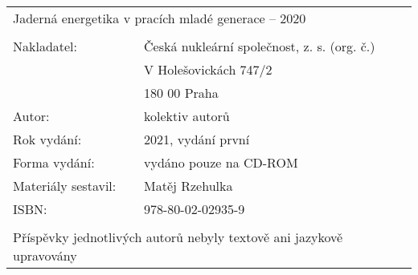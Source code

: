 \documentclass[11pt,oneside]{article}
\begin{document}
\vspace*{13cm}

\begin{table}[h]%
    \begin{tabular}{p{} p{}}%
        \multicolumn{2}{l}{Jaderná energetika v pracích mladé generace – 2020} \\
                            &                           \\
        Nakladatel:         & Česká nukleární společnost, z. s. (org. č.) \\
                            & V Holešovickách 747/2     \\
                            & 180 00 Praha              \\
        Autor:              & kolektiv autorů           \\
        Rok vydání: 	    & 2021, vydání první        \\
        Forma vydání:       & vydáno pouze na CD-ROM    \\    
        Materiály sestavil: & Matěj Rzehulka            \\
        ISBN:               & 978-80-02-02935-9         \\
                            &                           \\
        \multicolumn{2}{l}{Příspěvky jednotlivých autorů nebyly textově ani jazykově upravovány}
    \end{tabular}%
\end{table}%
\vfill
\end{document}
